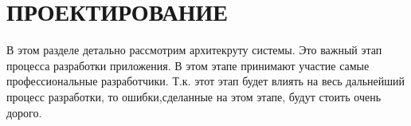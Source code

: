 \section{ПРОЕКТИРОВАНИЕ}

В этом разделе детально рассмотрим архитекруту системы.
Это важный этап процесса разработки приложения. В этом этапе принимают участие самые профессиональные разработчики. Т.к. этот этап будет влиять на весь дальнейший процесс разработки, то ошибки,сделанные на этом этапе, будут стоить очень дорого.



